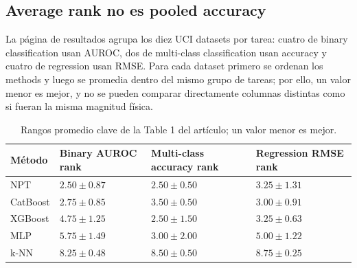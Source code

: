 

\subsection{Average rank no es pooled accuracy}

La página de resultados agrupa los diez UCI datasets por tarea: cuatro de binary classification usan AUROC, dos de multi-class classification usan accuracy y cuatro de regression usan RMSE. Para cada dataset primero se ordenan los methods y luego se promedia dentro del mismo grupo de tareas; por ello, un valor menor es mejor, y no se pueden comparar directamente columnas distintas como si fueran la misma magnitud física.


\begin{table}[H]
\centering
\small
\caption{Rangos promedio clave de la Table 1 del artículo; un valor menor es mejor.}
\begin{tabularx}{\textwidth}{L{0.22\textwidth}L{0.23\textwidth}L{0.23\textwidth}X}
\toprule
Método & Binary AUROC rank & Multi-class accuracy rank & Regression RMSE rank \\
\midrule
NPT & $2.50\pm0.87$ & $2.50\pm0.50$ & $3.25\pm1.31$ \\
CatBoost & $2.75\pm0.85$ & $3.50\pm0.50$ & $3.00\pm0.91$ \\
XGBoost & $4.75\pm1.25$ & $2.50\pm1.50$ & $3.25\pm0.63$ \\
MLP & $5.75\pm1.49$ & $3.00\pm2.00$ & $5.00\pm1.22$ \\
k-NN & $8.25\pm0.48$ & $8.50\pm0.50$ & $8.75\pm0.25$ \\
\bottomrule
\end{tabularx}
\end{table}

